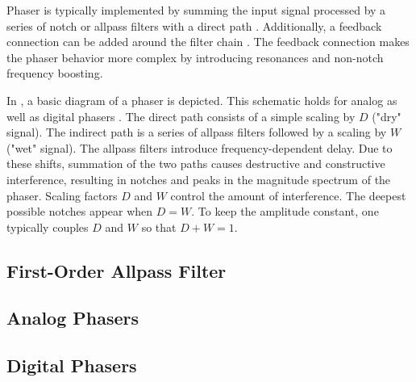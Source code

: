 Phaser is typically implemented by summing the input signal processed by a series of notch or allpass filters with a direct path \cite{Zoelzer2011}. Additionally, a feedback connection can be added around the filter chain \cite{Kiiski2016}. The feedback connection makes the phaser behavior more complex by introducing resonances and non-notch frequency boosting.

In , a basic diagram of a phaser is depicted. This schematic holds for analog as well as digital phasers \cite{PASPWEB2010}. The direct path consists of a simple scaling by $D$ ("dry" signal). The indirect path is a series of allpass filters followed by a scaling by $W$ ("wet" signal). The allpass filters introduce frequency-dependent delay. Due to these shifts, summation of the two paths causes destructive and constructive interference, resulting in notches and peaks in the magnitude spectrum of the phaser. Scaling factors $D$ and $W$ control the amount of interference. The deepest possible notches appear when $D = W$. To keep the amplitude constant, one typically couples $D$ and $W$ so that $D + W = 1$.


\subsection{First-Order Allpass Filter}

\subsection{Analog Phasers}

\subsection{Digital Phasers}

